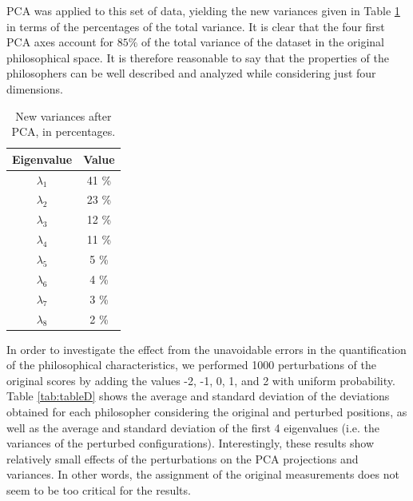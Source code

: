 \documentclass[%
 aip,
 jmp,%
 amsmath,amssymb,
 reprint,%
]{revtex4-1}
\begin{document}
PCA was applied to this set of data, yielding the new variances given
in Table \ref{tab:tableC} in terms of the percentages of the total
variance.  It is clear that the four first PCA axes account for
$85\%$ of the total variance of the dataset in the original
philosophical space.  It is therefore reasonable to say that the
properties of the philosophers can be well described and analyzed
while considering just four dimensions.


\begin{table}%
\caption{\label{tab:tableC}New variances after PCA, in percentages.}

\begin{tabular}{|c||c|}
\hline
Eigenvalue & Value \\ \hline
$\lambda_1$ &  41 \% \\
$\lambda_2$ &  23 \% \\
$\lambda_3$ &  12 \% \\
$\lambda_4$ &  11 \% \\
$\lambda_5$ &   5 \% \\
$\lambda_6$ &   4 \% \\
$\lambda_7$ &   3 \%    \\
$\lambda_8$ &   2 \%    \\
\hline

\end{tabular}
\end{table}

In order to investigate the effect from the unavoidable errors in the
quantification of the philosophical characteristics, we performed 1000
perturbations of the original scores by adding the values -2, -1, 0,
1, and 2 with uniform probability.  Table \ref{tab:tableD} shows the
average and standard deviation of the deviations obtained for each
philosopher considering the original and perturbed positions, as well
as the average and standard deviation of the first 4 eigenvalues
(i.e. the variances of the perturbed configurations).  Interestingly,
these results show relatively small effects of the perturbations on
the PCA projections and variances.  In other words, the assignment of
the original measurements does not seem to be too critical for the
results.
\end{document}
